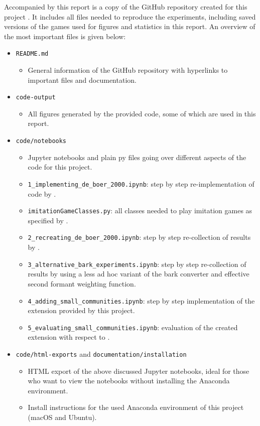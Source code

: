 Accompanied by this report is a copy of the GitHub repository created for this project \citep{github_project}.
It includes all files needed to reproduce the experiments, including saved versions of the games used for figures and statistics in this report.
An overview of the most important files is given below:
\begin{itemize}
    \item \texttt{README.md}
    \begin{itemize}
        \item General information of the GitHub repository with hyperlinks to important files and documentation. 
    \end{itemize}
    \item \texttt{code-output}
    \begin{itemize}
        \item All figures generated by the provided code, some of which are used in this report.
    \end{itemize}
    \item \texttt{code/notebooks}
    \begin{itemize}
        \item Jupyter notebooks and plain py files going over different aspects of the code for this project.
        \item \texttt{1\_implementing\_de\_boer\_2000.ipynb}: step by step re-implementation of code by \citet{deBoer2000}.
        \item \texttt{imitationGameClasses.py}: all classes needed to play imitation games as specified by \citet{deBoer2000}.
        \item \texttt{2\_recreating\_de\_boer\_2000.ipynb}: step by step re-collection of results by \citet{deBoer2000}.
        \item \texttt{3\_alternative\_bark\_experiments.ipynb}: step by step re-collection of results by \citet{deBoer2000} using a less ad hoc variant of the bark converter and effective second formant weighting function.
        \item \texttt{4\_adding\_small\_communities.ipynb}: step by step implementation of the extension provided by this project.
        \item \texttt{5\_evaluating\_small\_communities.ipynb}: evaluation of the created extension with respect to \citet{deBoer2000}.
    \end{itemize}
    \item \texttt{code/html-exports} and \texttt{documentation/installation}
    \begin{itemize}
        \item HTML export of the above discussed Jupyter notebooks, ideal for those who want to view the notebooks without installing the Anaconda environment.
        \item Install instructions for the used Anaconda environment of this project (macOS and Ubuntu).
    \end{itemize}
\end{itemize}